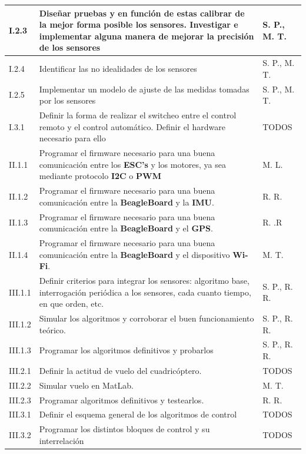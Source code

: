 \documentclass[spanish,12pt,a4paper,titlepage]{report}
\begin{document}
\begin{table}[H]
\begin{tabular}{|p{50pt}|p{250pt}|p{100pt}|} 
\hline
I.2.3  & Diseñar pruebas y en función de estas calibrar de la mejor forma posible los sensores. Investigar e implementar alguna manera de mejorar la precisión de los sensores  & S. P., M. T. \\ \hline
I.2.4 & Identificar las no idealidades de los sensores & S. P., M. T. \\ \hline
I.2.5 & Implementar un modelo de ajuste de las medidas tomadas por los sensores & S. P., M. T. \\ \hline
I.3.1 & Definir la forma de realizar el switcheo entre el control remoto y el control automático. Definir el hardware necesario para ello & TODOS \\ \hline \hline
II.1.1  & Programar el firmware necesario para una buena comunicación entre los \textbf{ESC's} y los motores, ya sea mediante protocolo \textbf{I2C} o \textbf{PWM} & M. L. \\ \hline
II.1.2  & Programar el firmware necesario para una buena comunicación entre la \textbf{BeagleBoard} y la \textbf{IMU}. & R. R. \\ \hline
II.1.3  & Programar el firmware necesario para una buena comunicación entre la \textbf{BeagleBoard} y el \textbf{GPS}. & R. .R \\ \hline 
II.1.4  & Programar el firmware necesario para una buena comunicación entre la \textbf{BeagleBoard} y el dispositivo \textbf{Wi-Fi}. & M. T. \\ \hline \hline
III.1.1  & Definir criterios para integrar los sensores: algoritmo base, interrogación periódica a los sensores, cada cuanto tiempo, en que orden, etc. & S. P., R. R. \\ \hline
III.1.2  & Simular los algoritmos y corroborar el buen funcionamiento teórico. & S. P., R. R. \\ \hline
III.1.3  & Programar los algoritmos definitivos y probarlos & S. P., R. R. \\ \hline 
III.2.1  & Definir la actitud de vuelo del cuadricóptero. & TODOS \\ \hline
III.2.2  & Simular vuelo en MatLab. & M. T. \\ \hline
III.2.3  & Programar algoritmos definitivos y testearlos. & R. R. \\ \hline
III.3.1  & Definir el esquema general de los algoritmos de control & TODOS \\ \hline
III.3.2  & Programar los distintos bloques de control y su interrelación & TODOS \\ \hline

\end{tabular}
\end{table}
\end{document}
